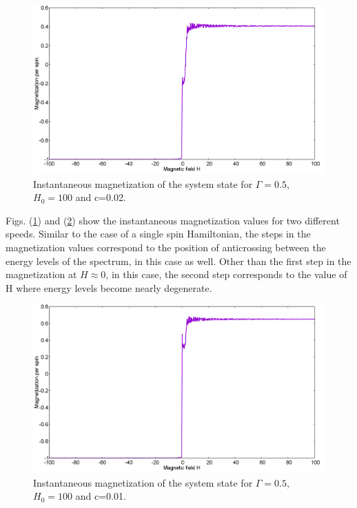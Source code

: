 \documentclass[../main.tex]{subfiles}
\begin{document}
\begin{figure}[H]
  \centering
    \includegraphics[scale=0.24]{Mag_13_H100.png}
    \caption{Instantaneous magnetization of the system state for $\Gamma=0.5$, $H_0=100$ and c=0.02.}
  \label{fig:lz5}
 \end{figure}

Figs. (\ref{fig:lz5}) and (\ref{fig:lz6}) show the instantaneous magnetization values for two different speeds. Similar to the case of a single spin Hamiltonian, the steps in the magnetization values correspond to the position of anticrossing between the energy levels of the spectrum, in this case as well. Other than the first step in the magnetization at $H \approx 0$, in this case, the second step corresponds to the value of H where energy levels become nearly degenerate.

 \begin{figure}[H]
  \centering
    \includegraphics[scale=0.24]{Mag_9_H100.png}
    \caption{Instantaneous magnetization of the system state for $\Gamma=0.5$, $H_0=100$ and c=0.01.}
  \label{fig:lz6}
\end{figure}
\end{document}
